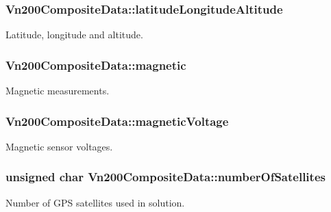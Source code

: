 \subsubsection[{\texorpdfstring{latitude\+Longitude\+Altitude}{latitudeLongitudeAltitude}}]{ Vn200\+Composite\+Data\+::latitude\+Longitude\+Altitude}\hypertarget{structVn200CompositeData_a0d4021656c0508cafaab079294a89bf3}{}\label{structVn200CompositeData_a0d4021656c0508cafaab079294a89bf3}
Latitude, longitude and altitude. 
\subsubsection[{\texorpdfstring{magnetic}{magnetic}}]{ Vn200\+Composite\+Data\+::magnetic}\hypertarget{structVn200CompositeData_adc0b6e40d7d534950a75d51f50ec41e7}{}\label{structVn200CompositeData_adc0b6e40d7d534950a75d51f50ec41e7}
Magnetic measurements. 
\subsubsection[{\texorpdfstring{magnetic\+Voltage}{magneticVoltage}}]{ Vn200\+Composite\+Data\+::magnetic\+Voltage}\hypertarget{structVn200CompositeData_aacc72f2786f804cd7cd6f90c18cbb6a1}{}\label{structVn200CompositeData_aacc72f2786f804cd7cd6f90c18cbb6a1}
Magnetic sensor voltages. 
\subsubsection[{\texorpdfstring{number\+Of\+Satellites}{numberOfSatellites}}]{\setlength{\rightskip}{0pt plus 5cm}unsigned char Vn200\+Composite\+Data\+::number\+Of\+Satellites}\hypertarget{structVn200CompositeData_afbc9fa81db935c26e10708d92464eec2}{}\label{structVn200CompositeData_afbc9fa81db935c26e10708d92464eec2}
Number of G\+PS satellites used in solution. 
